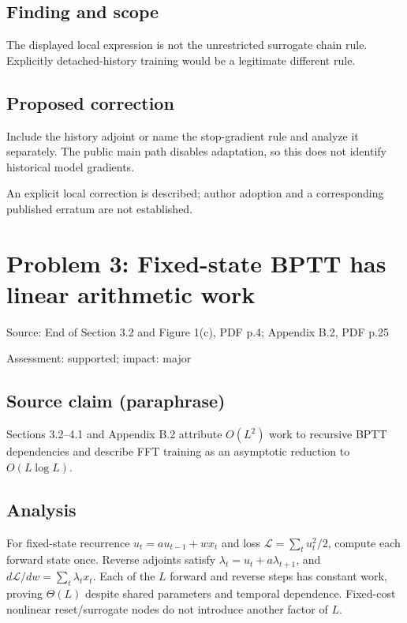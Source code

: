 \documentclass[11pt]{article}
\begin{document}
\subsection*{Finding and scope}

The displayed local expression is not the unrestricted surrogate chain rule. Explicitly detached-history training would be a legitimate different rule.

\subsection*{Proposed correction}

Include the history adjoint or name the stop-gradient rule and analyze it separately. The public main path disables adaptation, so this does not identify historical model gradients.

An explicit local correction is described; author adoption and a corresponding published erratum are not established.

\section*{Problem 3: Fixed-state BPTT has linear arithmetic work}

Source: End of Section 3.2 and Figure 1(c), PDF p.4; Appendix B.2, PDF p.25

Assessment: supported; impact: major

\subsection*{Source claim (paraphrase)}

Sections 3.2–4.1 and Appendix B.2 attribute \(O(L^2)\) work to recursive BPTT dependencies and describe FFT training as an asymptotic reduction to \(O(L\log L)\).

\subsection*{Analysis}

For fixed-state recurrence \(u_t=au_{t-1}+wx_t\) and loss \(\mathcal L=\sum_tu_t^2/2\), compute each forward state once. Reverse adjoints satisfy \(\lambda_t=u_t+a\lambda_{t+1}\), and \(d\mathcal L/dw=\sum_t\lambda_tx_t\). Each of the \(L\) forward and reverse steps has constant work, proving \(\Theta(L)\) despite shared parameters and temporal dependence. Fixed-cost nonlinear reset/surrogate nodes do not introduce another factor of \(L\).
\end{document}
